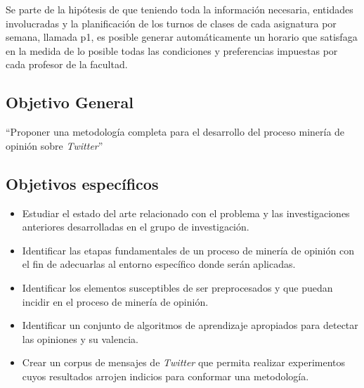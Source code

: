 \begin{introduction}
Se parte de la hipótesis de que teniendo toda la información necesaria, entidades involucradas y la
planificación de los turnos de clases de cada asignatura por semana, llamada p1, es posible generar
automáticamente un horario que satisfaga en la medida de lo posible todas las condiciones y preferencias
impuestas por cada profesor de la facultad.


\subsection*{Objetivo General}
  
  ``Proponer una metodología completa para el desarrollo del proceso
minería de opinión sobre \emph{Twitter}''

  \subsection*{Objetivos específicos}
\begin{itemize}
  \item Estudiar el estado del arte relacionado con el problema
  y las investigaciones anteriores 
  desarrolladas en el grupo de investigación.
  \item Identificar las etapas fundamentales de un proceso de 
  minería de opinión con el fin de adecuarlas al entorno específico
  donde serán aplicadas.
 \item Identificar los elementos susceptibles de ser preprocesados
 y que puedan incidir en el proceso de minería de opinión.
 \item Identificar un conjunto de algoritmos de aprendizaje apropiados
 para detectar las opiniones y su valencia.
 \item Crear un corpus de mensajes de \emph{Twitter} que permita realizar 
 experimentos cuyos resultados arrojen indicios para conformar una metodología.
\end{itemize}


\end{introduction}
